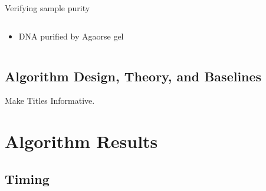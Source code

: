 \documentclass[usenames,dvipsnames]{beamer}
\begin{document}
\begin{frame}{Verifying sample purity}

\begin{columns}[T]
\begin{column}{0.6\textwidth}
  \begin{itemize}
  \item DNA purified by Agaorse gel 
  \end{itemize}
\end{column}
\begin{column}{0.4\textwidth}
\end{column}
\end{columns}


\begin{overlayarea}{\textwidth}{\textheight}
\end{overlayarea}

\end{frame}

\subsection{Algorithm Design, Theory, and Baselines}

\begin{frame}{Make Titles Informative.}


\end{frame}



\section{Algorithm Results}

\subsection{Timing}
\end{document}

